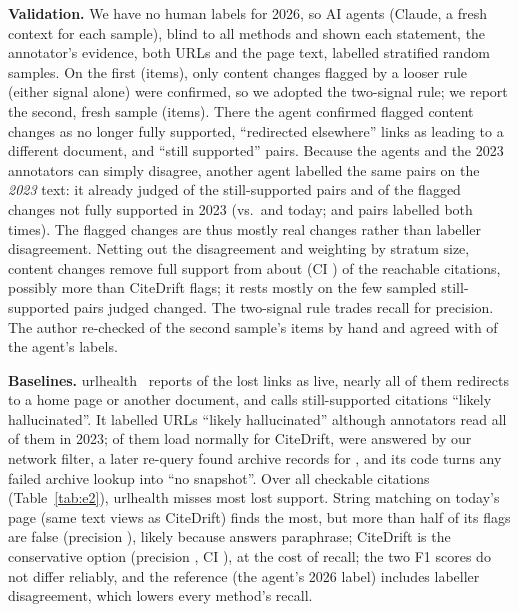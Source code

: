 \textbf{Validation.} We have no human labels for 2026, so AI agents (Claude, a fresh context for each sample), blind to all methods and shown each statement, the annotator's evidence, both URLs and the page text, labelled stratified random samples. On the first (\insOneN items), only \insOneChangedPrec content changes flagged by a looser rule (either signal alone) were confirmed, so we adopted the two-signal rule; we report the second, fresh sample (\insTwoN items). There the agent confirmed \insChangedPrec flagged content changes as no longer fully supported, \insAwayDifferent ``redirected elsewhere'' links as leading to a different document, and \insStillAgree ``still supported'' pairs. Because the agents and the 2023 annotators can simply disagree, another agent labelled the same pairs on the \emph{2023} text: it already judged \ctlStillThen of the still-supported pairs and \ctlChangedThen of the flagged changes not fully supported in 2023 (vs.\ \ctlStillNow and \ctlChangedNow today; \ctlStillN and \ctlChangedN pairs labelled both times). The flagged changes are thus mostly real changes rather than labeller disagreement. Netting out the disagreement and weighting by stratum size, content changes remove full support from about \ctlExcess (CI \ctlExcessCI) of the reachable citations, possibly more than CiteDrift flags; it rests mostly on the few sampled still-supported pairs judged changed. The two-signal rule trades recall for precision. The author re-checked \authorItems of the second sample's items by hand and agreed with \authorAgree of the agent's labels.

\textbf{Baselines.} urlhealth~\cite{rao2026detectingcorrectingreferencehallucinations} reports \uhLiveLinkLost of the \linkLostN lost links as live, nearly all of them redirects to a home page or another document, and calls \uhHalluStill still-supported citations ``likely hallucinated''. It labelled \wbN URLs ``likely hallucinated'' although annotators read all of them in 2023; \wbReachable of them load normally for CiteDrift, \wbFiltered were answered by our network filter, a later re-query found archive records for \wbCapture, and its code turns any failed archive lookup into ``no snapshot''. Over all checkable citations (Table~\ref{tab:e2}), urlhealth misses most lost support. String matching on today's page (same text views as CiteDrift) finds the most, but more than half of its flags are false (precision \bsSmP), likely because answers paraphrase; CiteDrift is the conservative option (precision \bsCdP, CI \bsCdPCI), at the cost of recall; the two F1 scores do not differ reliably, and the reference (the agent's 2026 label) includes labeller disagreement, which lowers every method's recall.

